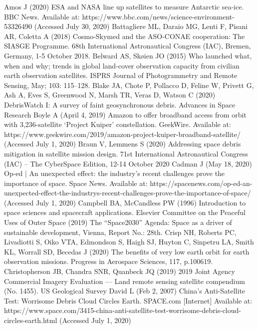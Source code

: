 \documentclass[12pt,a4paper,notitlepage,twoside,openright]{report}
\begin{document}
\begin{thebibliography}{100}
\bigskip

 Amos J (2020) ESA and NASA line up satellites to measure Antarctic sea-ice. BBC News. Available at: https://www.bbc.com/news/science-environment-53326490 (Accessed July 30, 2020)
 Battagliere ML, Daraio MG, Lenti F, Pisani AR, Coletta A (2018) Cosmo-Skymed and the ASO-CONAE cooperation: The SIASGE Programme. 68th International Astronautical Congress (IAC), Bremen, Germany, 1-5 October 2018.
 Belward AS, Skøien JO (2015) Who launched what, when and why; trends in global land-cover observation capacity from civilian earth observation satellites. ISPRS Journal of Photogrammetry and Remote Sensing, May; 103: 115–128.
 Blake JA, Chote P, Pollacco D, Feline W, Privett G, Ash A, Eves S, Greenwood N, Marsh TR, Veras D, Watson C (2020) DebrisWatch I: A survey of faint geosynchronous debris. Advances in Space Research
 Boyle A (April 4, 2019) Amazon to offer broadband access from orbit with 3,236-satellite ‘Project Kuiper’ constellation. GeekWire. Available at: https://www.geekwire.com/2019/amazon-project-kuiper-broadband-satellite/ (Accessed July 1, 2020)
 Braun V, Lemmens S (2020) Addressing space debris mitigation in satellite mission design. 71st International Astronautical Congress (IAC) – The CyberSpace Edition, 12-14 October 2020
 Cadman J (May 18, 2020) Op-ed | An unexpected effect: the industry’s recent challenges prove the importance of space. Space News. Available at: https://spacenews.com/op-ed-an-unexpected-effect-the-industrys-recent-challenges-prove-the-importance-of-space/ (Accessed July 1, 2020)
 Campbell BA, McCandless PW (1996) Introduction to space sciences and spacecraft applications. Elsevier
 Committee on the Peaceful Uses of Outer Space (2019) The “Space2030” Agenda: Space as a driver of sustainable development, Vienna, Report No.: 28th.
 Crisp NH, Roberts PC, Livadiotti S, Oiko VTA, Edmondson S, Haigh SJ, Huyton C, Sinpetru LA, Smith KL, Worrall SD, Becedas J (2020) The benefits of very low earth orbit for earth observation missions. Progress in Aerospace Sciences, 117, p.100619.
 Christopherson JB, Chandra SNR, Quanbeck JQ (2019) 2019 Joint Agency Commercial Imagery Evaluation — Land remote sensing satellite compendium (No. 1455). US Geological Survey
 David L (Feb 2, 2007) China's Anti-Satellite Test: Worrisome Debris Cloud Circles Earth. SPACE.com [Internet] Available at: https://www.space.com/3415-china-anti-satellite-test-worrisome-debris-cloud-circles-earth.html (Accessed July 1, 2020)

\end{thebibliography}
\end{document}
